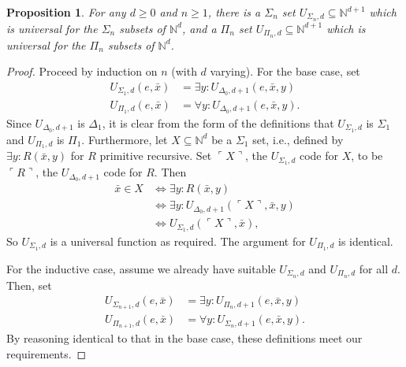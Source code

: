 \documentclass{article}
\theoremstyle{plain}
\newtheorem{prop}[thm]{Proposition}
\theoremstyle{definition}
\newcommand{\tuple}{\bar}
\newcommand{\lgnum}{\ulcorner}
\newcommand{\rgnum}{\urcorner}
\begin{document}
\begin{prop}
  For any $d \geq 0$ and $n \geq 1$, there is a $\Sigma_n$ set
  $U_{\Sigma_n,d} \subseteq \mathbb{N}^{d+1}$ which is universal for
  the $\Sigma_n$ subsets of $\mathbb{N}^d$, and a $\Pi_n$ set
  $U_{\Pi_n,d} \subseteq \mathbb{N}^{d+1}$ which is universal for the
  $\Pi_n$ subsets of $\mathbb{N}^d$.
\end{prop}
\begin{proof}
  Proceed by induction on $n$ (with $d$ varying). For the base case,
  set
  \begin{align*}
    U_{\Sigma_1,d}(e,\tuple{x}) &= \exists y : U_{\Delta_0,d+1}(e,\tuple{x},y) \\
    U_{\Pi_1,d}(e,\tuple{x}) &= \forall y : U_{\Delta_0,d+1}(e,\tuple{x},y)
    \text{.}
  \end{align*}
  Since $U_{\Delta_0,d+1}$ is $\Delta_1$, it is clear from the form of
  the definitions that $U_{\Sigma_1,d}$ is $\Sigma_1$ and
  $U_{\Pi_1,d}$ is $\Pi_1$. Furthermore, let $X \subseteq
  \mathbb{N}^d$ be a $\Sigma_1$ set, i.e., defined by $\exists y :
  R(\tuple{x},y)$ for $R$ primitive recursive. Set $\lgnum X \rgnum$,
  the $U_{\Sigma_1,d}$ code for $X$, to be $\lgnum R \rgnum$, the
  $U_{\Delta_0,d+1}$ code for $R$. Then
  \begin{align*}
    \tuple{x} \in X
    &\iff \exists y : R(\tuple{x}, y) \\
    &\iff \exists y : U_{\Delta_0,d+1}(\lgnum X \rgnum, \tuple{x}, y) \\
    &\iff U_{\Sigma_1,d}(\lgnum X \rgnum, \tuple{x})
    \text{,}
  \end{align*}
  So $U_{\Sigma_1,d}$ is a universal function as required. The
  argument for $U_{\Pi_1,d}$ is identical.

  For the inductive case, assume we already have suitable
  $U_{\Sigma_n,d}$ and $U_{\Pi_n,d}$ for all $d$. Then, set
  \begin{align*}
    U_{\Sigma_{n+1},d}(e,\tuple{x}) &= \exists y : U_{\Pi_n,d+1}(e,\tuple{x},y) \\
    U_{\Pi_{n+1},d}(e,\tuple{x}) &= \forall y : U_{\Sigma_n,d+1}(e,\tuple{x},y)
    \text{.}
  \end{align*}
  By reasoning identical to that in the base case, these definitions
  meet our requirements.
\end{proof}
\end{document}
